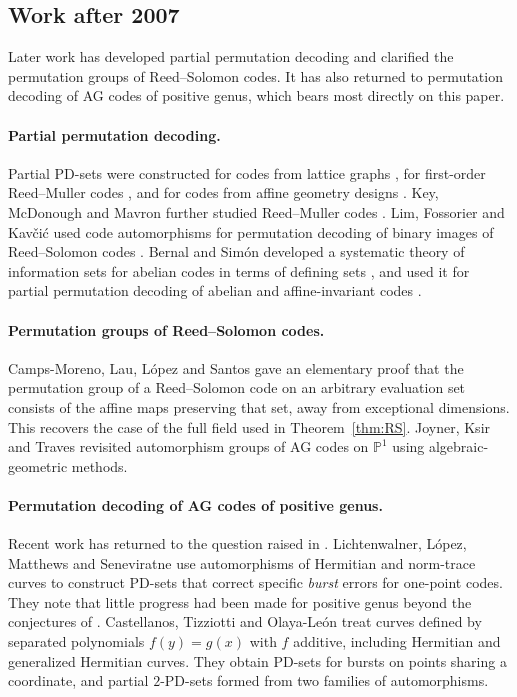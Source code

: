 \documentclass[12pt,letterpaper]{article}
\theoremstyle{definition}
\theoremstyle{remark}
\numberwithin{equation}{section}
\newcommand{\PP}{\mathbb{P}}
\begin{document}
\subsection{Work after 2007}

Later work has developed partial permutation decoding and clarified the
permutation groups of Reed--Solomon codes. It has also returned to
permutation decoding of AG codes of positive genus, which bears most
directly on this paper.

\paragraph{Partial permutation decoding.}
Partial PD-sets were constructed for codes from lattice graphs
\cite{KS08}, for first-order Reed--Muller codes \cite{Sen09}, and for
codes from affine geometry designs \cite{KMM08}.  Key, McDonough and
Mavron further studied Reed--Muller codes \cite{KMM10,KMM17}.  Lim,
Fossorier and Kav\v{c}i\'c used code automorphisms for permutation
decoding of binary images of Reed--Solomon codes \cite{LFK10}.  Bernal and
Sim\'on developed a systematic theory of information sets for abelian
codes in terms of defining sets \cite{BS11,BS14}, and used it for partial
permutation decoding of abelian and affine-invariant codes
\cite{BS13,BS23}.

\paragraph{Permutation groups of Reed--Solomon codes.}
Camps-Moreno, Lau, L\'opez and Santos gave an elementary proof \cite{CLLS25}
that the permutation group of a Reed--Solomon code on an arbitrary
evaluation set consists of the affine maps preserving that set, away from
exceptional dimensions.  This recovers the case of the full field used in
Theorem~\ref{thm:RS}.  Joyner, Ksir and Traves \cite{JKT08} revisited
automorphism groups of AG codes on $\PP^1$ using algebraic-geometric
methods.

\paragraph{Permutation decoding of AG codes of positive genus.}
Recent work has returned to the question raised in \cite{Jo05}.
Lichtenwalner, L\'opez, Matthews and Seneviratne \cite{LLMS26} use
automorphisms of Hermitian and norm-trace curves to construct PD-sets that
correct specific \emph{burst} errors for one-point codes.  They note that
little progress had been made for positive genus beyond the conjectures
of \cite{Jo05}.  Castellanos, Tizziotti and Olaya-Le\'on \cite{CTO26}
treat curves defined by separated polynomials $f(y)=g(x)$ with $f$
additive, including Hermitian and generalized Hermitian curves.  They
obtain PD-sets for bursts on points sharing a coordinate, and partial
$2$-PD-sets formed from two families of automorphisms.
\end{document}
